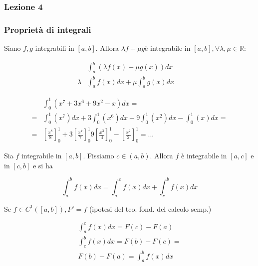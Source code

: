 

\subsubsection{Lezione 4}

\subsubsection{Proprietà di integrali}

\begin{proprieta}
    Siano $f,g$ integrabili in $[a,b]$. Allora $\lambda f + \mu g$è integrabile in $[a,b], \forall \lambda,\mu\in \mathbb{R}:$

    \begin{align}
        & \int_{a}^{b}(\lambda f(x)+\mu g(x))dx = \\
        \lambda & \int_{a}^{b} f(x)dx+\mu \int_{a}^{b} g(x)dx
    \end{align}
\end{proprieta}

\begin{esempio}
    \begin{align}
          & \int_{0}^{1}(x^7+3x^6+9x^2-x)dx = \\
        = & \int_{0}^{1}(x^7)dx + 3\int_{0}^{1}(x^6)dx + 9\int_{0}^{1}(x^2)dx - \int_{0}^{1}(x)dx = \\
        = & [\frac{x^8}{8}]_0^1 + 3[\frac{x^7}{7}]_0^1 9[\frac{x^3}{3}]_0^1 - [\frac{x^2}{2}]_0^1 = ...
    \end{align}
\end{esempio}

\begin{proprieta}
    \label{p_add}
    Sia $f$ integrabile in $[a,b]$. Fissiamo $c\in(a,b)$. Allora $f$ è integrabile in $[a,c]$ e in $[c,b]$ e si ha

    \begin{equation}
        \int_{a}^{b}f(x)dx=\int_{a}^{c}f(x)dx+\int_{c}^{b}f(x)dx
    \end{equation}
\end{proprieta}

\begin{osservazione}
    Se $f\in C^1([a,b]), F'=f$ (ipotesi del teo. fond. del calcolo semp.)

    \begin{gather}
        \int_{a}^{c} f(x) dx = F(c) - F(a) \\
        \int_{c}^{b} f(x) dx = F(b) - F(c) = \\
        F(b) - F(a) = \int_{a}^{b} f(x) dx
    \end{gather}
\end{osservazione}

